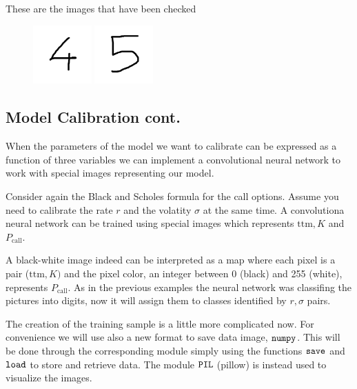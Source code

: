 These are the images that have been checked

\begin{figure}[htb]
	\centering
	\includegraphics[width=0.2\textwidth]{figures/four.png}
	\includegraphics[width=0.2\textwidth]{figures/five.png}
\end{figure}

\subsection{Model Calibration cont.}\label{model-calibration-cont.}

When the parameters of the model we want to calibrate can be expressed
as a function of three variables we can implement a convolutional neural network to work with special images representing our model.

Consider again the Black and Scholes formula for the call options.
Assume you need to calibrate the rate \(r\) and the volatity \(\sigma\)
at the same time. A convolutiona neural network can be trained using
special images which represents \(\mathrm{ttm}, K\) and
\(P_\textrm{call}\).

A black-white image indeed can be interpreted as a map where each pixel
is a pair (\(\mathrm{ttm}, K)\) and the pixel color, an integer between
0 (black) and 255 (white), represents \(P_\textrm{call}\). As in the
previous examples the neural network was classifing the pictures into
digits, now it will assign them to classes identified by \(r, \sigma\)
pairs.

The creation of the training sample is a little more complicated now.
For convenience we will use also a new format to save data image,
\(\tt{numpy}\). This will be done through the corresponding module
simply using the functions \(\tt{save}\) and \(\tt{load}\) to store and
retrieve data. The module \(\tt{PIL}\) (pillow) is instead used to
visualize the images.

